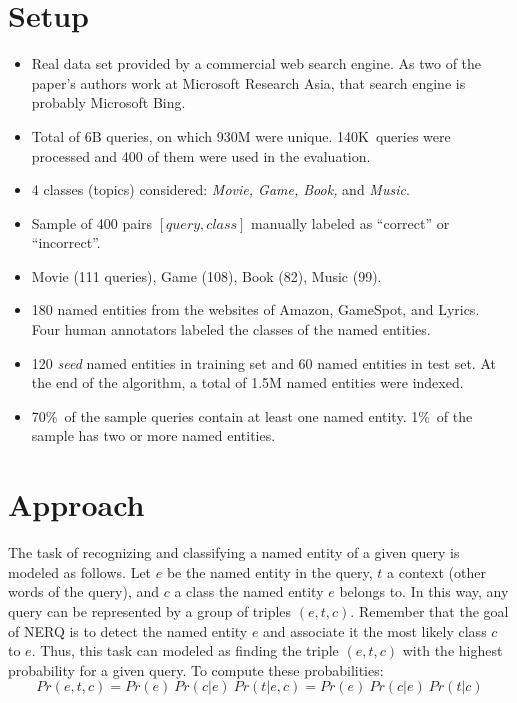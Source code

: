 \documentclass[sigconf]{acmart} %
\begin{document}
\section{Setup} 

\begin{itemize}
\item Real data set provided by a commercial web search engine. As two of the paper's authors work at Microsoft Research Asia, that search engine is probably Microsoft Bing\texttrademark.
\item Total of 6B queries, on which 930M were unique. 140K~queries were processed and 400 of them were used in the evaluation.
\item 4 classes (topics) considered: \textit{Movie, Game, Book,} and \textit{Music}.
\item Sample of 400 pairs $[query, class]$ manually labeled as ``correct'' or ``incorrect''.
\item Movie (111 queries), Game (108), Book (82), Music (99).
\item 180 named entities from the websites of Amazon, GameSpot, and Lyrics. Four human annotators labeled the classes of the named entities.
\item 120 \textit{seed} named entities in training set and 60 named entities in test set. At the end of the algorithm, a total of 1.5M named entities were indexed.
\item 70\%~of the sample queries contain at least one named entity. 1\%~of the sample has two or more named entities.
\end{itemize}


\section{Approach}

The task of recognizing and classifying a named entity of a given query is modeled as follows. Let $e$ be the named entity in the query, $t$ a context (other words of the query), and $c$ a class the named entity $e$ belongs to. In this way, any query can be represented by a group of triples $(e, t, c)$. Remember that the goal of NERQ is to detect the named entity $e$ and associate it the most likely class $c$ to $e$. Thus, this task can modeled as finding the triple $(e, t, c)$ with the highest probability for a given query. To compute these probabilities:
\begin{equation*}
Pr(e, t, c) = Pr(e) \ Pr(c|e) \ Pr(t|e,c)  = Pr(e) \ Pr(c|e) \ Pr(t|c)
\end{equation*}
\end{document}
